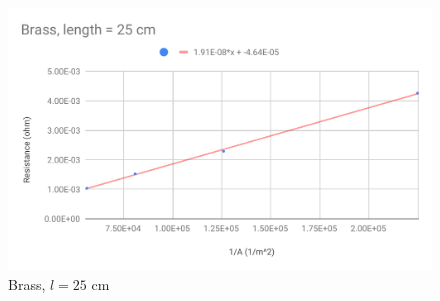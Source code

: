 %
\begin{figure}[ht]
	\centering
	\includegraphics[scale=0.74]{image/02-resistance/25cm.pdf}
	\caption{Brass, $l = 25$ cm}
	\label{figure.02.25cm}
\end{figure}
%
